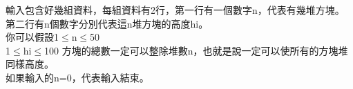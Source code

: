 輸入包含好幾組資料，每組資料有2行，第一行有一個數字n，代表有幾堆方塊。\\
第二行有n個數字分別代表這n堆方塊的高度hi。\\
你可以假設1$\leq$n$\leq$50\\
 1$\leq$hi$\leq$100 方塊的總數一定可以整除堆數n，也就是說一定可以使所有的方塊堆同樣高度。\\
 如果輸入的n=0，代表輸入結束。\\
